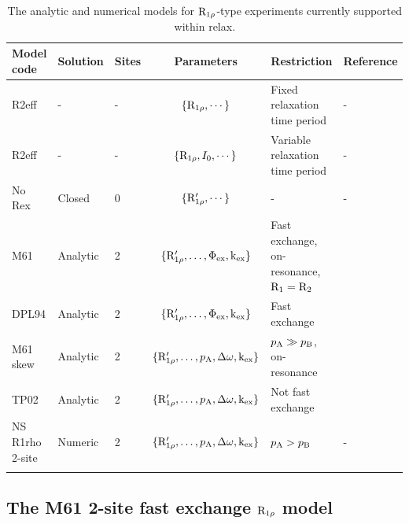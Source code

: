 \begin{table}
\begin{center}
\caption{The analytic and numerical models for $\mathrm{R}_{1\rho}$-type experiments currently supported within relax.}
\begin{tabular}{lllcll}
\toprule
Model code      & Solution & Sites & Parameters                                        & Restriction                       & Reference \\
\midrule                            
R2eff           & -        & -     & $\{\mathrm{R}_{1\rho}, \cdots\}$                            & Fixed relaxation time period      & - \\
R2eff           & -        & -     & $\{\mathrm{R}_{1\rho}, I_0, \cdots\}$                       & Variable relaxation time period   & - \\
No Rex          & Closed   & 0     & $\{\mathrm{R}_{1\rho}', \cdots\}$                       & -                                 & - \\
M61             & Analytic & 2     & $\{\mathrm{R}_{1\rho}', \dots, \Phi_\textrm{ex}, \textrm{k}_\textrm{ex}\}$          & Fast exchange, on-resonance, $\mathrm{R}_1 = \mathrm{R}_2$ & \citet{Meiboom61} \\
DPL94           & Analytic & 2     & $\{\mathrm{R}_{1\rho}', \dots, \Phi_\textrm{ex}, \textrm{k}_\textrm{ex}\}$          & Fast exchange                     & \citet{Davis94} \\
M61 skew        & Analytic & 2     & $\{\mathrm{R}_{1\rho}', \dots, p_\textrm{A}, \Delta\omega, \textrm{k}_\textrm{ex}\}$        & $p_\textrm{A} \gg p_\textrm{B}$, on-resonance       & \citet{Meiboom61} \\
TP02            & Analytic & 2     & $\{\mathrm{R}_{1\rho}', \dots, p_\textrm{A}, \Delta\omega, \textrm{k}_\textrm{ex}\}$        & Not fast exchange                 & \citet{TrottPalmer02} \\
NS R1rho 2-site & Numeric  & 2     & $\{\mathrm{R}_{1\rho}', \dots, p_\textrm{A}, \Delta\omega, \textrm{k}_\textrm{ex}\}$        & $p_\textrm{A} > p_\textrm{B}$                       & - \\
\bottomrule
\label{table: R1rho dispersion models}
\end{tabular}
\end{center}
\end{table}



\subsection{The M61 2-site fast exchange $\mathrm{R}_{1\rho}$ model}
\label{sect: dispersion: M61 model}

